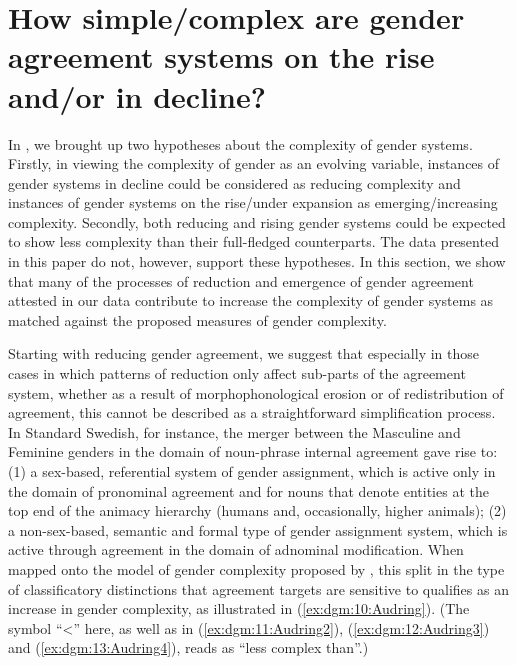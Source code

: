 \documentclass[output=collectionpaper]{langsci/langscibook}
\begin{document}
\section{How simple/complex are gender agreement systems on the rise and/or in decline?}
\label{sec:dgm:simple/compl}
In , we brought up two hypotheses about the complexity of gender systems.  Firstly, in viewing the complexity of gender as an evolving variable, instances of gender systems in decline could be considered as reducing complexity and instances of gender systems on the rise/under expansion as emerging/increasing complexity. Secondly, both reducing and rising gender systems could be expected to show less complexity than their full-fledged counterparts. The data presented in this paper do not, however, support these hypotheses. In this section, we show that many of the processes of reduction and emergence of gender agreement attested in our data contribute to increase the complexity of gender systems as matched against the proposed measures of gender complexity.


Starting with reducing gender agreement, we suggest that especially in those cases in which patterns of reduction only affect sub-parts of the agreement system, whether as a result of morphophonological erosion or of redistribution of agreement, this cannot be described as a straightforward simplification process. In Standard Swedish, for instance, the merger between the Masculine and Feminine genders in the domain of noun-phrase internal agreement gave rise to: (1) a sex-based, referential system of gender assignment, which is active only in the domain of pronominal agreement and for nouns that denote entities at the top end of the animacy hierarchy (humans and, occasionally, higher animals); (2) a non-sex-based, semantic and formal type of gender assignment system, which is active through agreement in the domain of adnominal modification. When mapped onto the model of gender complexity proposed by \citet{Audring2017},  this split in the type of classificatory distinctions that agreement targets are sensitive to qualifies as an increase in gender complexity, as illustrated in (\ref{ex:dgm:10:Audring}). (The symbol ``{\textless}'' here, as well as in (\ref{ex:dgm:11:Audring2}), (\ref{ex:dgm:12:Audring3}) and (\ref{ex:dgm:13:Audring4}), reads as ``less complex than''.)

\ea\label{ex:dgm:10:Audring}
\\
\end{document}
